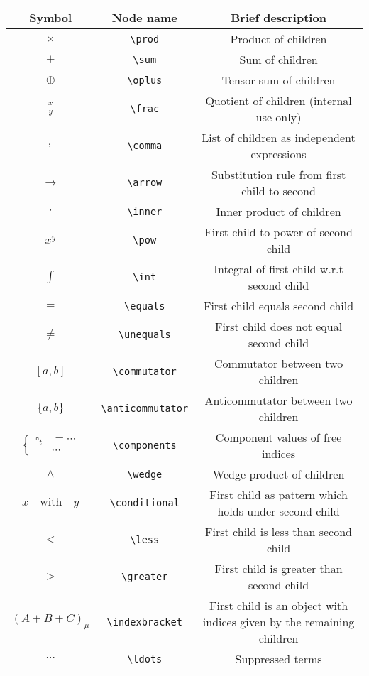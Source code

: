 \documentclass{article}
\begin{document}
\begin{table}[H]
	\centering
	\renewcommand{\arraystretch}{1.5}
	\begin{tabular}{|c|c|c|}
	\hline
	\rowcolor[HTML]{C0C0C0} 
	Symbol & Node name & Brief description    \\ \hline
	$\times$ & \verb|\prod| 
		& Product of children\\ \hline
	$+$ & \verb|\sum| 
		& Sum of children  \\ \hline
	$\oplus$ & \verb|\oplus| 
		& Tensor sum of children \\ \hline
	$\frac{x}{y}$ & \verb|\frac| 
		& Quotient of children (internal use only)  \\ \hline
	$,$ & \verb|\comma| 
		& List of children as independent expressions \\ \hline
	$\rightarrow$ & \verb|\arrow| 
		& Substitution rule from first child to second \\ \hline
	$\cdot$ & \verb|\inner| 
		& Inner product of children \\ \hline
	$x^y$ & \verb|\pow| 
		& First child to power of second child \\ \hline
	$\int$ & \verb|\int| 
		& Integral of first child w.r.t second child \\ \hline
	$=$ & \verb|\equals| 
		& First child equals second child \\ \hline
	$\neq$ & \verb|\unequals| 
		& First child does not equal second child \\ \hline
	$[a, b]$ & \verb|\commutator| 
		& Commutator between two children \\ \hline
	$\{a, b\}$ & \verb|\anticommutator| 
		& Anticommutator between  two children \\ \hline
	$\left\{\begin{aligned}\square_t &= \cdots \\ &\cdots\end{aligned}\right.$ & \verb|\components|
		& Component values of free indices \\ \hline
	$\wedge$ & \verb|\wedge| 
		& Wedge product of children \\ \hline
	$x\quad\text{with}\quad y$ & \verb|\conditional| 
		& First child as pattern which holds under second child \\ \hline
	$<$ & \verb|\less| 
		& First child is less than second child\\ \hline
	$>$ & \verb|\greater| 
		& First child is greater than second child\\ \hline
	$(A+B+C)_\mu$ & \verb|\indexbracket|
		& First child is an object with indices given by the remaining children \\ \hline
	$\cdots$ & \verb|\ldots|
		& Suppressed terms \\ \hline
	
	\end{tabular}
\end{table}
\end{document}
